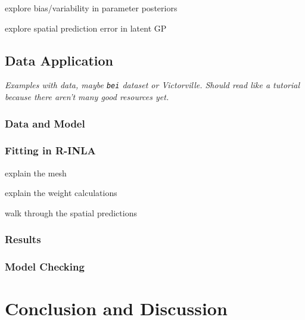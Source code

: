 \documentclass[]{interact}
\begin{document}
explore bias/variability in parameter posteriors

explore spatial prediction error in latent GP


\subsection{Data Application}

{\it Examples with data, maybe \texttt{bei} dataset or Victorville. Should read
like a tutorial because there aren't many good resources yet.}

\subsubsection{Data and Model}


\subsubsection{Fitting in R-INLA}

explain the mesh

explain the weight calculations

walk through the spatial predictions


\subsubsection{Results}


\subsubsection{Model Checking}


\section{Conclusion and Discussion}



\end{document}

